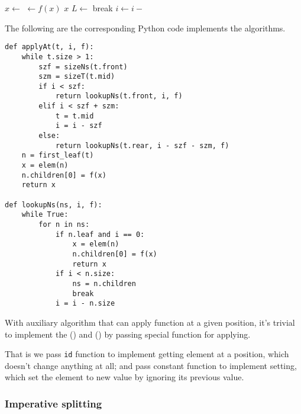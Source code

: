 \documentclass[UTF8]{article}
\begin{document}
\begin{algorithmic}
  \Loop
        \State $x \gets $ 
        \State {} $\gets f(x)$
        \State \Return $x$
      \EndIf
        \State $L \gets $ 
        \State break
      \EndIf
      \State $i \gets i - $ 
    \EndFor
  \EndLoop
\EndFunction
\end{algorithmic}

The following are the corresponding Python code implements the algorithms.

\lstset{language=Python}
\begin{lstlisting}
def applyAt(t, i, f):
    while t.size > 1:
        szf = sizeNs(t.front)
        szm = sizeT(t.mid)
        if i < szf:
            return lookupNs(t.front, i, f)
        elif i < szf + szm:
            t = t.mid
            i = i - szf
        else:
            return lookupNs(t.rear, i - szf - szm, f)
    n = first_leaf(t)
    x = elem(n)
    n.children[0] = f(x)
    return x

def lookupNs(ns, i, f):
    while True:
        for n in ns:
            if n.leaf and i == 0:
                x = elem(n)
                n.children[0] = f(x)
                return x
            if i < n.size:
                ns = n.children
                break
            i = i - n.size
\end{lstlisting}

With auxiliary algorithm that can apply function at a given position, it's trivial to implement
the () and () by passing special function for applying.

\begin{algorithmic}
  \State \Return {}
\EndFunction
\Statex
{}
  \State \Return {}
\EndFunction
\end{algorithmic}

That is we pass \verb|id| function to implement getting element at a position, which doesn't
change anything at all; and pass constant function to implement setting, which set the element
to new value by ignoring its previous value.

\subsubsection{Imperative splitting}
\end{document}

